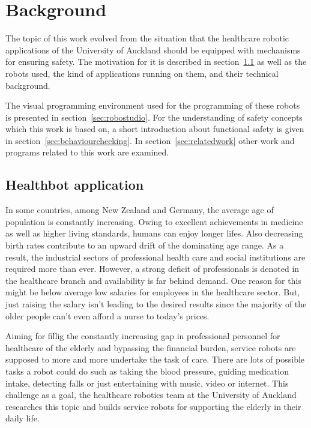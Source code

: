 \chapter{Background}
\label{chap:background}

The topic of this work evolved from the situation that the healthcare robotic applications of the University of Auckland should be equipped with mechanisms for ensuring safety.
The motivation for it is described in section~\ref{sec:healthbotapplication} as well as the robots used, the kind of applications running on them, and their technical background.

The visual programming environment used for the programming of these robots is presented in section~\ref{sec:robostudio}.
For the understanding of safety concepts which this work is based on, a short introduction about functional safety is given in section~\ref{sec:behaviourchecking}. In section~\ref{sec:relatedwork} other work and programs related to this work are examined.




\section{Healthbot application}
\label{sec:healthbotapplication}

In some countries, among New Zealand and Germany, the average age of population is constantly increasing. Owing to excellent achievements in medicine as well as higher living standards, humans can enjoy longer lifes. Also decreasing birth rates contribute to an upward drift of the dominating age range. As a result, the industrial sectors of professional health care and social institutions are required more than ever.
However, a strong deficit of professionals is denoted in the healthcare branch and availability is far behind demand. One reason for this might be below average low salaries for employees in the healthcare sector. But, just raising the salary isn't leading to the desired results since the majority of the older people can't even afford a nurse to today's prices.

Aiming for fillig the constantly increasing gap in professional personnel for healthcare of the elderly and bypassing the financial burden, service robots are supposed to more and more undertake the task of care.
There are lots of possible tasks a robot could do such as taking the blood pressure, guiding medication intake, detecting falls or just entertaining with music, video or internet.
This challenge as a goal, the healthcare robotics team at the University of Auckland researches this topic and builds service robots for supporting the elderly in their daily life.

